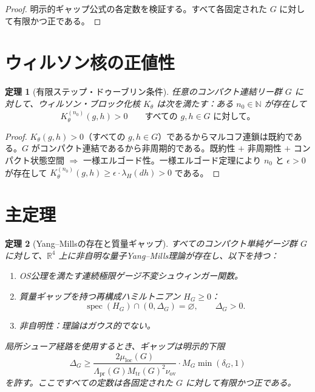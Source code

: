 \documentclass[12pt]{article}
\theoremstyle{plain}
\newtheorem{theorem}{定理}[section]
\theoremstyle{definition}
\numberwithin{equation}{section}
\newcommand{\R}{\mathbb{R}}
\newcommand{\N}{\mathbb{N}}
\newcommand{\spec}{\operatorname{spec}}
\newcommand{\pr}{\mathrm{pr}}
\newcommand{\loc}{\mathrm{loc}}
\newcommand{\ov}{\mathrm{ov}}
\newcommand{\tr}{\mathrm{tr}}
\begin{document}
\begin{proof}
明示的ギャップ公式の各定数を検証する。すべて各固定された $G$ に対して有限かつ正である。
\end{proof}

\section{ウィルソン核の正値性}\label{sec:doeblin}

\begin{theorem}[有限ステップ・ドゥーブリン条件]\label{thm:doeblin}
任意のコンパクト連結リー群 $G$ に対して、ウィルソン・ブロック化核 $K_\theta$ は次を満たす：ある $n_0\in\N$ が存在して
\begin{equation}
K_\theta^{(n_0)}(g,h) > 0\qquad\text{すべての }g,h\in G\text{ に対して。}
\end{equation}
\end{theorem}

\begin{proof}
$K_\theta(g,h)>0$（すべての $g,h\in G$）であるからマルコフ連鎖は既約である。$G$ がコンパクト連結であるから非周期的である。既約性 $+$ 非周期性 $+$ コンパクト状態空間 $\Rightarrow$ 一様エルゴード性。一様エルゴード定理により $n_0$ と $\epsilon>0$ が存在して $K_\theta^{(n_0)}(g,h)\geq\epsilon\cdot\lambda_H(dh)>0$ である。
\end{proof}



\section*{主定理}

\begin{theorem}[Yang--Millsの存在と質量ギャップ]\label{thm:main}
すべてのコンパクト単純ゲージ群 $G$ に対して、$\R^4$ 上に非自明な量子Yang--Mills理論が存在し、以下を持つ：
\begin{enumerate}[label=(\roman*)]
\item OS公理を満たす連続極限ゲージ不変シュウィンガー関数。
\item 質量ギャップを持つ再構成ハミルトニアン $H_G\geq 0$：
\begin{equation}
\boxed{\spec(H_G)\cap(0,\Delta_G)=\varnothing,\qquad \Delta_G>0.}
\end{equation}
\item 非自明性：理論はガウス的でない。
\end{enumerate}
局所シューア経路を使用するとき、ギャップは明示的下限
\begin{equation}
\Delta_G \geq \frac{2\mu_{\loc}(G)}{\Lambda_{\pr}(G)M_{\tr}(G)^2\nu_{\ov}}\cdot M_G\min(\delta_G,1)
\end{equation}
を許す。ここですべての定数は各固定された $G$ に対して有限かつ正である。
\end{theorem}
\end{document}
